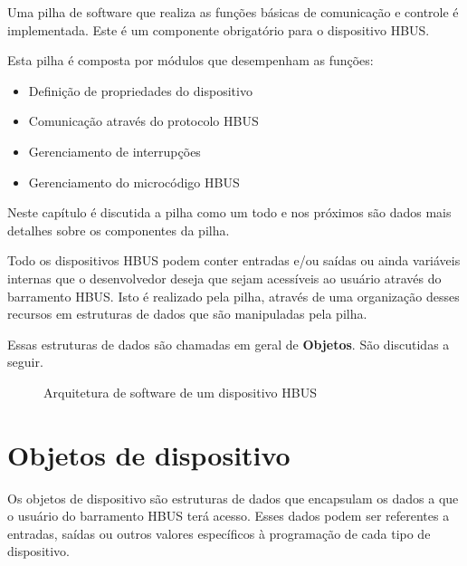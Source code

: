 
Uma pilha de software que realiza as funções básicas de comunicação e controle é implementada. Este é um componente obrigatório para o dispositivo HBUS.

Esta pilha é composta por módulos que desempenham as funções:

\begin{itemize}

\item Definição de propriedades do dispositivo
\item Comunicação através do protocolo HBUS
\item Gerenciamento de interrupções
\item Gerenciamento do microcódigo HBUS

\end{itemize}

Neste capítulo é discutida a pilha como um todo e nos próximos são dados mais detalhes sobre os componentes da pilha.

Todo os dispositivos HBUS podem conter entradas e/ou saídas ou ainda variáveis internas que o desenvolvedor deseja que sejam acessíveis ao usuário através do barramento HBUS. Isto é realizado pela pilha, através de uma organização desses recursos em estruturas de dados que são manipuladas pela pilha.

Essas estruturas de dados são chamadas em geral de \textbf{Objetos}. São discutidas a seguir.

\newcommand{\tstrcommunication}{Protocolo de \\ Comunicação}
\newcommand{\tstrobjects}{Objetos}
\newcommand{\tstrucode}{Microcódigo}
\newcommand{\tstrhbusstack}{Pilha HBUS}
\newcommand{\tstrhbusdevice}{Dispositivo HBUS}
\newcommand{\tstrdevicecode}{Código do dispositivo (firmware)}

\begin{figure}[h]
\centering

\caption{Arquitetura de software de um dispositivo HBUS}
\end{figure}

\section{Objetos de dispositivo}

Os objetos de dispositivo são estruturas de dados que encapsulam os dados a que o usuário do barramento HBUS terá acesso. Esses dados podem ser referentes a entradas, saídas ou outros valores específicos à programação de cada tipo de dispositivo.

